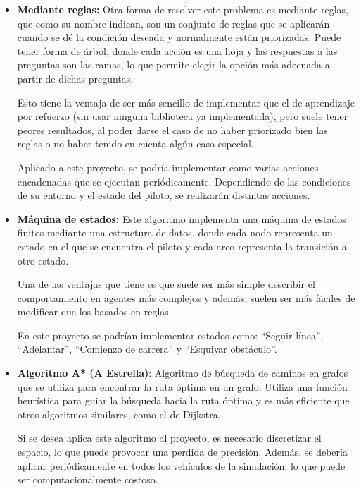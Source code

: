 \documentclass[a4paper,11pt]{book}
\begin{document}
\begin{itemize}
   \item \textbf{Mediante reglas:} Otra forma de resolver este problema es mediante reglas, que como su nombre indican, son un conjunto de reglas que se aplicarán cuando se dé la condición deseada y normalmente están priorizadas. Puede tener forma de árbol, donde cada acción es una hoja y las respuestas a las preguntas son las ramas, lo que permite elegir la opción más adecuada a partir de dichas preguntas.
   
   Esto tiene la ventaja de ser más sencillo de implementar que el de aprendizaje por refuerzo (sin usar ninguna biblioteca ya implementada), pero suele tener peores resultados, al poder darse el caso de no haber priorizado bien las reglas o no haber tenido en cuenta algún caso especial.

   Aplicado a este proyecto, se podría implementar como varias acciones encadenadas que se ejecutan periódicamente. Dependiendo de las condiciones de su entorno y el estado del piloto, se realizarán distintas acciones.

   \item \textbf{Máquina de estados:} Este algoritmo implementa una máquina de estados finitos mediante una estructura de datos, donde cada nodo representa un estado en el que se encuentra el piloto y cada arco representa la transición a otro estado. 
   
   Una de las ventajas que tiene es que suele ser más simple describir el comportamiento en agentes más complejos y además, suelen ser más fáciles de modificar que los basados en reglas.

   En este proyecto se podrían implementar estados como: ``Seguir línea'', ``Adelantar'', ``Comienzo de carrera'' y ``Esquivar obstáculo''.

   \item \textbf{Algoritmo A* (A Estrella)}: Algoritmo de búsqueda de caminos en grafos que se utiliza para encontrar la ruta óptima en un grafo. Utiliza una función heurística para guiar la búsqueda hacia la ruta óptima y es más eficiente que otros algoritmos similares, como el de Dijkstra.
   
   Si se desea aplica este algoritmo al proyecto, es necesario discretizar el espacio, lo que puede provocar una perdida de precisión. Además, se debería aplicar periódicamente en todos los vehículos de la simulación, lo que puede ser computacionalmente costoso.



\end{itemize}
\end{document}

